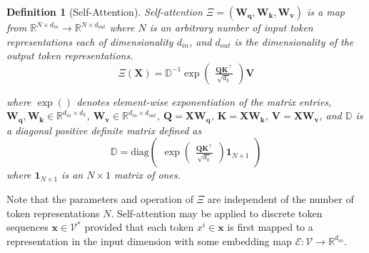 \documentclass{article} %
\newtheorem{definition}{Definition}
\begin{document}
\begin{definition}[Self-Attention]
    \label{def:self-attention}
    Self-attention $\Xi = (\mathbf{W_q, W_k, W_v})$ is a map from $\mathbb R^{N\times d_{in}} \to \mathbb R^{N \times d_{out}}$ where $N$ is an arbitrary number of input token representations each of dimensionality $d_{in}$, and $d_{out}$ is the dimensionality of the output token representations. 
    \begin{equation}
        \label{eqn:self-attention}
        \Xi(\mathbf X) = \mathbb D^{-1} \exp \begin{pmatrix}
            \frac{\mathbf {QK^\top}}{\sqrt{d_k}} 
        \end{pmatrix} \mathbf V
    \end{equation}

    where $\exp()$ denotes element-wise exponentiation of the matrix entries, $\mathbf{W_q, W_k} \in \mathbb R^{d_{in} \times d_k}$, $\mathbf {W_v} \in \mathbb R^{d_{in} \times d_{out}}$, $\mathbf{Q = X W_q}$, $\mathbf{K = X W_k}$, $\mathbf{V = X W_v}$, and $\mathbb D$ is a diagonal positive definite matrix defined as 
    \begin{equation}
        \label{eqn:denominator-definition}
        \mathbb D = \text{diag} \begin{pmatrix}
            \exp\begin{pmatrix}
                \frac{\mathbf{Q K^\top}}{\sqrt{d_k}}
            \end{pmatrix}
            \mathbf 1_{N\times 1}
        \end{pmatrix}
    \end{equation}
    where $\mathbf 1_{N\times 1}$ is an $N\times 1$ matrix of ones. 
\end{definition}

Note that the parameters and operation of $\Xi$ are independent of the number of token representations $N$. Self-attention may be applied to discrete token sequences $\mathbf x\in \mathcal V^*$ provided that each token $x^i\in \mathbf x$ is first mapped to a representation in the input dimension with some embedding map $\mathcal E: \mathcal V \to \mathbb R^{d_{in}}$. 
\end{document}

